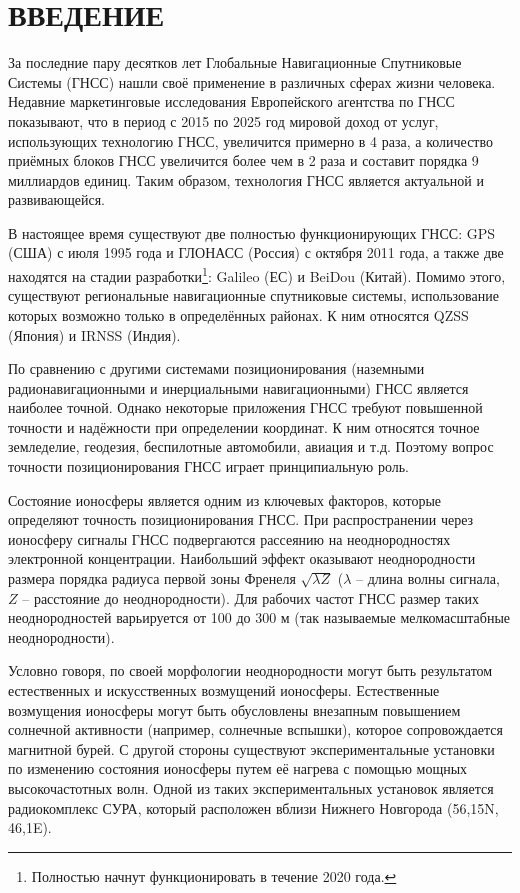 \chapter*{ВВЕДЕНИЕ}

За последние пару десятков лет Глобальные Навигационные Спутниковые Системы (ГНСС) нашли своё применение в различных сферах жизни человека.
Недавние маркетинговые исследования Европейского агентства по ГНСС \cite{EGA2017} показывают, что в период с 2015 по 2025 год мировой доход от услуг, использующих технологию ГНСС, увеличится примерно в 4 раза, а количество приёмных блоков ГНСС увеличится более чем в 2 раза и составит порядка 9 миллиардов единиц. 
Таким образом, технология ГНСС является актуальной и развивающейся.

В настоящее время существуют две полностью функционирующих ГНСС: GPS (США) с июля 1995 года и ГЛОНАСС (Россия) с октября 2011 года, а также две находятся на стадии разработки\footnote{Полностью начнут функционировать в течение 2020 года.}: Galileo (ЕС) и BeiDou (Китай).
Помимо этого, существуют региональные навигационные спутниковые системы, использование которых возможно только в определённых районах.
К ним относятся QZSS (Япония) и IRNSS (Индия).

По сравнению с другими системами позиционирования (наземными радионавигационными и инерциальными навигационными) ГНСС является наиболее точной.
Однако некоторые приложения ГНСС требуют повышенной точности и надёжности при определении координат.
К ним относятся точное земледелие, геодезия, беспилотные автомобили, авиация и т.д.  
Поэтому вопрос точности позиционирования ГНСС играет принципиальную роль.

Состояние ионосферы является одним из ключевых факторов, которые определяют точность позиционирования ГНСС. 
При распространении через ионосферу сигналы ГНСС подвергаются рассеянию на неоднородностях электронной концентрации. 
Наибольший эффект оказывают неоднородности размера порядка радиуса первой зоны Френеля $\sqrt{\lambda Z}$ ($\lambda$ -- длина волны сигнала, $Z$ -- расстояние до неоднородности). 
Для рабочих частот ГНСС размер таких неоднородностей варьируется от 100 до 300 м (так называемые мелкомасштабные неоднородности). 

Условно говоря, по своей морфологии неоднородности могут быть результатом естественных и искусственных возмущений ионосферы.
Естественные возмущения ионосферы могут быть обусловлены внезапным повышением солнечной активности (например, солнечные вспышки), которое сопровождается магнитной бурей.  
С другой стороны существуют экспериментальные установки по изменению состояния ионосферы путем её нагрева с помощью мощных высокочастотных волн. 
Одной из таких экспериментальных установок является радиокомплекс СУРА, который расположен вблизи Нижнего Новгорода (56,15\degree N, 46,1\degree E).

